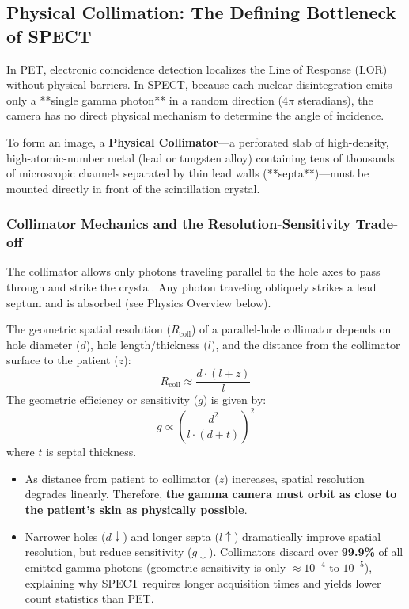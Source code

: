 \documentclass[11pt,a4paper]{article}
\begin{document}
\subsection{Physical Collimation: The Defining Bottleneck of SPECT}
In PET, electronic coincidence detection localizes the Line of Response (LOR) without physical barriers. In SPECT, because each nuclear disintegration emits only a **single gamma photon** in a random direction ($4\pi$ steradians), the camera has no direct physical mechanism to determine the angle of incidence.

To form an image, a \textbf{Physical Collimator}—a perforated slab of high-density, high-atomic-number metal (lead or tungsten alloy) containing tens of thousands of microscopic channels separated by thin lead walls (**septa**)—must be mounted directly in front of the scintillation crystal.

\subsubsection{Collimator Mechanics and the Resolution-Sensitivity Trade-off}
The collimator allows only photons traveling parallel to the hole axes to pass through and strike the crystal. Any photon traveling obliquely strikes a lead septum and is absorbed (see Physics Overview below).

\begin{physicsoverview}
The geometric spatial resolution ($R_{\text{coll}}$) of a parallel-hole collimator depends on hole diameter ($d$), hole length/thickness ($l$), and the distance from the collimator surface to the patient ($z$):
\begin{equation}
    R_{\text{coll}} \approx \frac{d \cdot (l + z)}{l}
\end{equation}
The geometric efficiency or sensitivity ($g$) is given by:
\begin{equation}
    g \propto \left(\frac{d^2}{l \cdot (d + t)}\right)^2
\end{equation}
where $t$ is septal thickness. 
\begin{itemize}
    \item As distance from patient to collimator ($z$) increases, spatial resolution degrades linearly. Therefore, \textbf{the gamma camera must orbit as close to the patient's skin as physically possible}.
    \item Narrower holes ($d \downarrow$) and longer septa ($l \uparrow$) dramatically improve spatial resolution, but reduce sensitivity ($g \downarrow$). Collimators discard over \textbf{99.9\%} of all emitted gamma photons (geometric sensitivity is only $\approx 10^{-4}$ to $10^{-5}$), explaining why SPECT requires longer acquisition times and yields lower count statistics than PET.
\end{itemize}
\end{physicsoverview}
\end{document}
